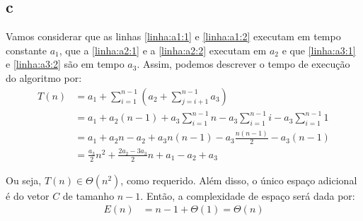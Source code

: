 \itemdsep
\subsection{c}

Vamos considerar que as linhas \ref{linha:a1:1} e \ref{linha:a1:2} executam em tempo constante $a_1$, que a \ref{linha:a2:1} e a \ref{linha:a2:2} executam em $a_2$ e que \ref{linha:a3:1} e \ref{linha:a3:2} são em tempo $a_3$. Assim, podemos descrever o tempo de execução do algoritmo por:
\begin{align*}
    T(n) &= a_1 + \sum_{i = 1}^{n - 1}\left(a_2 + \sum_{j = i + 1}^{n - 1} a_3\right) \\
    &= a_1 + a_2 (n - 1) + a_3 \sum_{i = 1}^{n - 1} n - a_3 \sum_{i = 1}^{n - 1} i - a_3 \sum_{i = 1}^{n - 1} 1 \\
    &= a_1 + a_2 n - a_2 + a_3 n (n - 1) - a_3 \frac{n (n - 1)}{2} - a_3 (n - 1) \\
    &= \frac{a_3}{2} n^2 + \frac{2 a_2 - 3 a_3}{2} n + a_1 - a_2 + a_3
\end{align*}

Ou seja, $T(n) \in \Theta\left(n^2\right)$, como requerido. Além disso, o único espaço adicional é do vetor $C$ de tamanho $n - 1$. Então, a complexidade de espaço será dada por:
\begin{align*}
    E(n) &= n - 1 + \Theta(1) = \Theta(n)
\end{align*}
